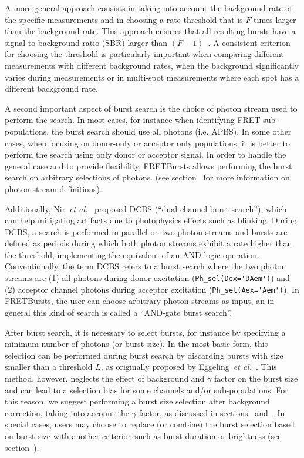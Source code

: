 \documentclass[10pt,letterpaper]{article}
\begin{document}
A more general approach consists in taking into account the background rate of
the specific measurements and in choosing a rate threshold that is $F$ times
larger than the background rate. This approach ensures that all resulting bursts
have a signal-to-background ratio (SBR) larger than
$(F-1)$~\cite{Michalet_2012}. A consistent criterion for choosing the threshold is
particularly important when comparing different measurements with different background
rates, when the background significantly varies during measurements or in
multi-spot measurements where each spot has a different background rate.

A second important aspect of burst search is the choice of photon stream used
to perform the search.
In most cases, for instance when identifying FRET sub-populations,
the burst search should use all photons (i.e. APBS). In some other cases, when focusing on
donor-only or acceptor only populations, it is better to perform the search using
only donor or acceptor signal.
In order to handle the general case and to provide flexibility,
FRETBursts allows performing the burst search on arbitrary selections of photons.
(see section~ for more information on photon stream definitions).

Additionally, Nir~\textit{et al.}~\cite{Nir_2006} proposed DCBS (``dual-channel burst search''), which can help mitigating artifacts due to photophysics effects such as blinking.
During DCBS, a search is performed in parallel on two photon streams
and bursts are defined as periods during which both photon streams exhibit a rate higher than
the threshold, implementing the equivalent of an AND logic operation.
Conventionally, the term DCBS refers to a burst search where the two photon streams
are (1) all photons during donor excitation (\verb|Ph_sel(Dex='DAem')|) and
(2) acceptor channel photons during acceptor excitation (\verb|Ph_sel(Aex='Aem')|).
In FRETBursts, the user can choose arbitrary photon streams as input, an in general
this kind of search is called a ``AND-gate burst search''.

After burst search, it is necessary to select
bursts, for instance by specifying a minimum number of photons (or burst size). In the most
basic form, this selection can be performed during burst search by discarding
bursts with size smaller than a threshold $L$, as originally proposed by
Eggeling~\textit{et al.}~\cite{Eggeling_1998}.
This method, however, neglects the effect
of background and $\gamma$ factor on the burst size and can lead to a selection
bias for some channels and/or sub-populations.
For this reason, we suggest performing a burst size selection after background
correction, taking into account the $\gamma$ factor, as discussed in
sections~ and~.
In special cases, users may choose to replace (or combine)
the burst selection based on burst size
with another criterion such as burst duration or brightness (see section~).
\end{document}
